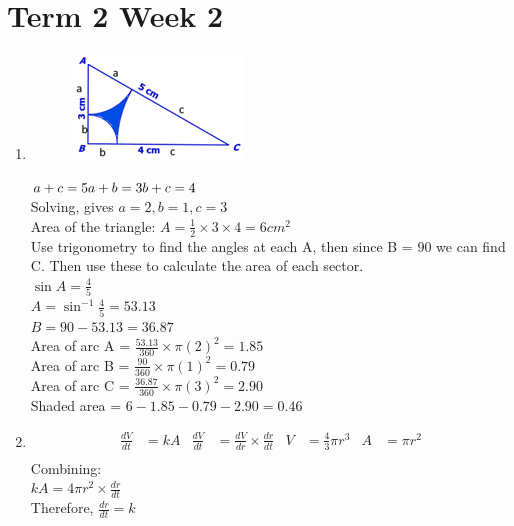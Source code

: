 \documentclass[../main.tex]{subfiles}
\begin{document}
\section*{Term 2 Week 2}
\begin{enumerate}
    \item 
    \begin{figure}[H]
        \centering
        \includegraphics[width=0.25\linewidth]{images/t2w2q1_a.png}
    \end{figure}
    \(a+c=5\\
    a+b=3\\
    b+c=4\)\\
    Solving, gives \(a=2, b=1, c=3\)\\
    Area of the triangle: \(A=\frac{1}{2}\times 3 \times 4=6cm^2\)\\

    Use trigonometry to find the angles at each A, then since B = 90 we can find C. Then use these to calculate the area of each sector.\\

    \(\sin{A}=\frac{4}{5}\)\\
    \(A=\sin^{-1}{\frac{4}{5}}=53.13\)\\
    \(B=90-53.13=36.87\)\\
    Area of arc A = \(\frac{53.13}{360}\times \pi(2)^2=1.85\)\\
    Area of arc B = \(\frac{90}{360}\times \pi(1)^2=0.79\)\\
    Area of arc C = \(\frac{36.87}{360}\times \pi (3)^2=2.90\)\\
    Shaded area = \(6-1.85-0.79-2.90=0.46\)\\

    \item 
    \begin{align*}
    \frac{dV}{dt}&=kA        &   \frac{dV}{dt}&=\frac{dV}{dr}\times \frac{dr}{dt}         &  V&=\frac{4}{3}\pi r^3           &  A&=\pi r^2\\
    \end{align*}
    Combining:\\
    \(kA=4\pi r^2 \times \frac{dr}{dt}\)\\
    Therefore, \(\frac{dr}{dt}=k\)\\
    

\end{enumerate}
\end{document}
